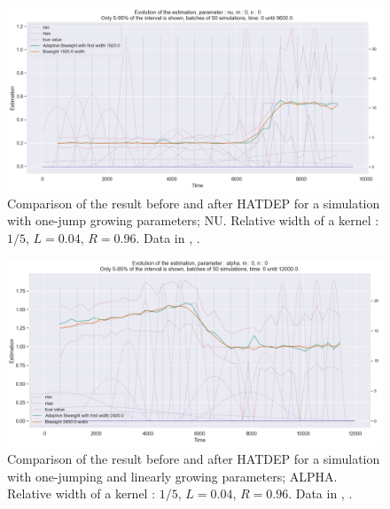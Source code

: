 \begin{figure}
\centering
\includegraphics[width = 0.90 \textwidth]{../imag/chap3/2_bis/R.png}
\caption{Comparison of the result before and after HATDEP for a simulation with one-jump growing parameters; NU. Relative width of a kernel : $1/5$, $L = 0.04$, $R = 0.96$. Data in \protect {}, \protect {}.}
\label{fig:second_estimate_2_nu}
\end{figure}






\begin{figure}
\centering
\includegraphics[width = 0.90 \textwidth]{../imag/chap3/3_bis/P.png}
\caption{Comparison of the result before and after HATDEP for a simulation with one-jumping and linearly growing parameters; ALPHA. Relative width of a kernel : $1/5$, $L = 0.04$, $R = 0.96$. Data in \protect {}, \protect {}.}
\label{fig:second_estimate_3_alpha}
\end{figure}


